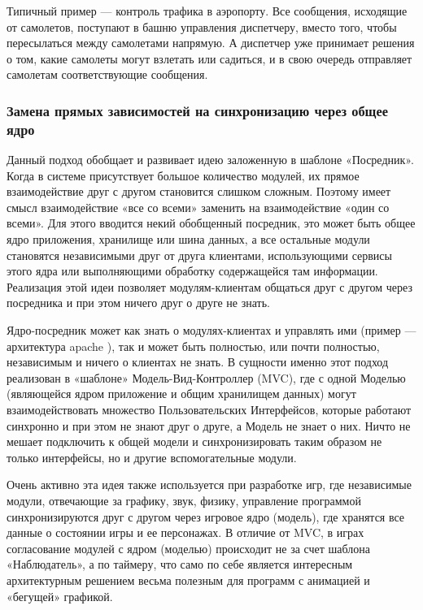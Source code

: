 \documentclass[a4paper]{article}
\begin{document}
\begin{itemize}
Типичный пример — контроль трафика в аэропорту. Все сообщения, исходящие от самолетов, поступают в башню управления диспетчеру, вместо того, чтобы пересылаться между самолетами напрямую. А диспетчер уже принимает решения о том, какие самолеты могут взлетать или садиться, и в свою очередь отправляет самолетам соответствующие сообщения.

\end{itemize}

\subsubsection{Замена прямых зависимостей на синхронизацию через общее ядро}

Данный подход обобщает и развивает идею заложенную в шаблоне «Посредник». Когда в системе присутствует большое количество модулей, их прямое взаимодействие друг с другом становится слишком сложным. Поэтому имеет смысл взаимодействие «все со всеми» заменить на взаимодействие «один со всеми». Для этого вводится некий обобщенный посредник, это может быть общее ядро приложения, хранилище или шина данных, а все остальные модули становятся независимыми друг от друга клиентами, использующими сервисы этого ядра или выполняющими обработку содержащейся там информации. Реализация этой идеи позволяет модулям-клиентам общаться друг с другом через посредника и при этом ничего друг о друге не знать.

Ядро-посредник может как знать о модулях-клиентах и управлять ими (пример — архитектура apache ), так и может быть полностью, или почти полностью, независимым и ничего о клиентах не знать. В сущности именно этот подход реализован в «шаблоне» Модель-Вид-Контроллер (MVC), где с одной Моделью (являющейся ядром приложение и общим хранилищем данных) могут взаимодействовать множество Пользовательских Интерфейсов, которые работают синхронно и при этом не знают друг о друге, а Модель не знает о них. Ничто не мешает подключить к общей модели и синхронизировать таким образом не только интерфейсы, но и другие вспомогательные модули.

Очень активно эта идея также используется при разработке игр, где независимые модули, отвечающие за графику, звук, физику, управление программой синхронизируются друг с другом через игровое ядро (модель), где хранятся все данные о состоянии игры и ее персонажах. В отличие от MVC, в играх согласование модулей с ядром (моделью) происходит не за счет шаблона «Наблюдатель», а по таймеру, что само по себе является интересным архитектурным решением весьма полезным для программ с анимацией и «бегущей» графикой.
\end{document}
